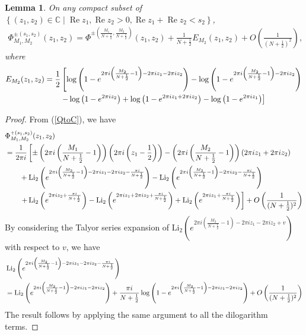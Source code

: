 \documentclass[10pt,a4paper]{article}
\newcommand{\lt}{\left}
\newcommand{\rt}{\right}
\def \CC{\mathbb C}
\def \Re{\operatorname{Re}}
\newtheorem{lemma}{Lemma}
\def\CC{{\mathbb C}}
\def \Re{\operatorname{Re}}
\def \Li{\operatorname{Li_2}}
\begin{document}
\begin{lemma}\label{EM_2}
On any compact subset of $\lt\{ (z_1,z_2) \in \CC \mid \Re z_1 , \Re z_2 >0, \Re z_1 + \Re z_2 < s_2 \rt\}$,
\begin{align}
\Phi^{\pm(s_1,s_2)}_{M_1,M_2}(z_1, z_2 )
= \Phi^{\pm\lt(\frac{M_1}{N+\frac{1}{2}}, \frac{M_2}{N+\frac{1}{2}}\rt)} (z_1,z_2) +\frac{1}{N+\frac{1}{2}}E_{M_2}(z_1,z_2) + O\lt(\frac{1}{\lt(N+\frac{1}{2}\rt)^2}\rt),
\end{align}
where
\begin{align}
E_{M_2}(z_1,z_2) 
&= \frac{1}{2}\lt[ \log\lt(1-e^{2\pi i \lt(\frac{M_2}{N+\frac{1}{2}}-1\rt) - 2\pi i z_1 - 2\pi i z_2 }\rt)
- \log\lt(1-e^{2\pi i \lt(\frac{M_2}{N+\frac{1}{2}}-1\rt) - 2\pi i z_2 } \rt) \rt.\notag\\
&\lt.\qquad - \log\lt(1- e^{2\pi i z_2 } \rt)
+ \log\lt(1- e^{2\pi iz_1+ 2\pi i z_2} \rt) 
- \log\lt(1-  e^{2\pi i z_1 } \rt) \rt]
\end{align}
\end{lemma}

\begin{proof}
From (\ref{QtoC}), we have
\begin{align}
&\Phi^{+(s_1,s_2)}_{M_1,M_2}(z_1, z_2 ) \notag\\
&=  \frac{1}{2\pi i} \lt[ \pm \lt(2\pi i \lt( \frac{M_1}{N+\frac{1}{2}} - 1\rt)\rt) \lt(2\pi i \lt(z_1 -\frac{1}{2} \rt)\rt)  - \lt(2\pi i \lt(\frac{M_2}{N+\frac{1}{2}}-1\rt)\rt)(2\pi i z_1 + 2\pi i z_2)  \rt. \notag\\
&\qquad + \Li\lt(e^{2\pi i \lt(\frac{M_2}{N+\frac{1}{2}}-1\rt) - 2\pi i z_1 - 2\pi i z_2 - \frac{\pi i}{N+\frac{1}{2}}}\rt) - \Li\lt( e^{2\pi i \lt(\frac{M_2}{N+\frac{1}{2}}-1\rt) - 2\pi i z_2 - \frac{\pi i}{N+\frac{1}{2}}}\rt) \notag\\
&\qquad \lt.+ \Li \lt(e^{2\pi i z_2 + \frac{\pi i}{N+\frac{1}{2}}}\rt) - \Li\lt(e^{2\pi iz_1+ 2\pi i z_2 + \frac{\pi i}{N+\frac{1}{2}}}\rt) + \Li\lt(e^{2\pi i z_1 + \frac{\pi i}{N+\frac{1}{2}}}\rt)  \rt] + O\lt(\frac{1}{(N+\frac{1}{2})^2}\rt)
\end{align}
By considering the Talyor series expansion of $\Li\lt(e^{2\pi i \lt(\frac{M_2}{N+\frac{1}{2}}-1\rt) - 2\pi i z_1 - 2\pi i z_2 + v}\rt)$ with respect to $v$, we have
\begin{align}
&\Li\lt(e^{2\pi i \lt(\frac{M_2}{N+\frac{1}{2}}-1\rt) - 2\pi i z_1 - 2\pi i z_2 - \frac{\pi i}{N+\frac{1}{2}}}\rt) \notag\\
&= \Li\lt(e^{2\pi i \lt(\frac{M_2}{N+\frac{1}{2}}-1\rt) - 2\pi i z_1 - 2\pi i z_2}\rt)+\frac{\pi i}{N+\frac{1}{2}}\log\lt(1-e^{2\pi i \lt(\frac{M_2}{N+\frac{1}{2}}-1\rt) - 2\pi i z_1 - 2\pi i z_2}\rt)
+  O\lt(\frac{1}{(N+\frac{1}{2})^2}\rt)
\end{align}
The result follows by applying the same argument to all the dilogarithm terms.
\end{proof}
\end{document}
